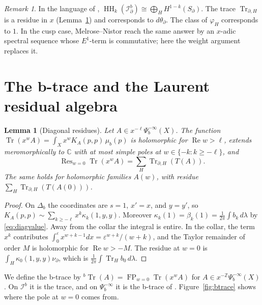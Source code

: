 \documentclass[11pt,oneside,reqno]{article}
\DeclareMathOperator{\HH}{HH}
\newcommand{\C}{\mathbb C}
\newcommand{\Z}{\mathbb Z}
\DeclareMathOperator{\Tr}{Tr}
\newcommand{\Ib}{\mathcal I^b}
\newcommand{\Idb}{\mathcal I^b_\partial}
\theoremstyle{plain}
\newtheorem{lemma}[theorem]{Lemma}
\theoremstyle{definition}
\theoremstyle{remark}
\newtheorem{remark}[theorem]{Remark}
\begin{document}
\begin{remark}
In the language of \cite[(16), (68)]{MN},
\(\HH_k(\Idb)\cong\bigoplus_HH^{1-k}(S_\partial)\). The trace
\(\Tr_{\partial,H}\) is a residue in \(x\) (Lemma~\ref{lem:residue}) and
corresponds to \(d\theta_\partial\). The class of \(\varphi_H\) corresponds
to \(1\). In the cusp case, Melrose--Nistor reach the same answer by an
\(x\)-adic spectral sequence whose \(E^1\)-term is commutative; here the
weight argument replaces it.
\end{remark}

\section{The b-trace and the Laurent residual algebra}\label{sec:btrace}

\begin{lemma}[Diagonal residues]\label{lem:residue}
Let \(A\in x^{-\ell}\Psi_b^{-\infty}(X)\). The function
\(\Tr(x^wA)=\int_Xx^wK_A(p,p)\,\mu_b(p)\) is holomorphic for
\(\operatorname{Re}w>\ell\), extends meromorphically to \(\C\) with at
most simple poles at \(w\in\{-k:k\geq-\ell\}\), and
\[
 \operatorname{Res}_{w=0}\Tr(x^wA)=\sum_H\Tr_{\partial,H}(T(A)).
\]
The same holds for holomorphic families \(A(w)\), with residue
\(\sum_H\Tr_{\partial,H}(T(A(0)))\).
\end{lemma}

\begin{proof}
On \(\Delta_b\) the coordinates are \(s=1\), \(x'=x\), and \(y=y'\), so
\(K_A(p,p)\sim\sum_{k\geq-\ell}x^k\kappa_k(1,y,y)\). Moreover
\(\kappa_k(1)=\beta_k(1)=\frac1{2\pi}\int b_k\,d\lambda\) by
\eqref{eq:diagvalue}. Away from the collar the integral is entire. In the
collar, the term \(x^k\) contributes
\(\int_0^\varepsilon x^{w+k-1}dx=\varepsilon^{w+k}/(w+k)\), and the Taylor
remainder of order \(M\) is holomorphic for \(\operatorname{Re}w>-M\). The
residue at \(w=0\) is \(\int_H\kappa_0(1,y,y)\nu_\partial\), which is
\(\frac1{2\pi}\int\Tr_Hb_0\,d\lambda\).
\end{proof}

We define the b-trace by
\({}^b\Tr(A)=\operatorname{FP}_{w=0}\Tr(x^wA)\) for
\(A\in x^{-\Z}\Psi_b^{-\infty}(X)\). On \(\Ib\) it is the trace, and on
\(\Psi_b^{-\infty}\) it is the b-trace of \cite[Sect.~``The b-trace
defect'']{Notes}. Figure~\ref{fig:btrace} shows where the pole at \(w=0\)
comes from.
\end{document}
